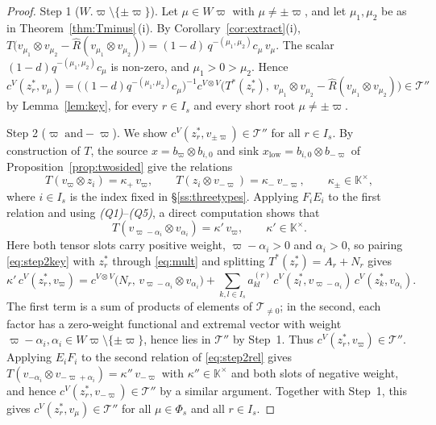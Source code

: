 \documentclass[12pt]{amsart}
\theoremstyle{plain}
\theoremstyle{remark}
\newcommand{\ot}{\otimes}
\newcommand{\vp}{\varpi}
\newcommand{\Rhat}{\widehat{R}}
\newcommand{\Phis}{\Phi_{s}}
\newcommand{\K}{\mathbb{K}}
\begin{document}
\begin{proof}
Step 1 ($W.\vp \setminus \{\pm \vp\}$). Let $\mu\in W\vp$ with $\mu\neq\pm\vp$, and let
$\mu_1,\mu_2$ be as in Theorem~\ref{thm:Tminus}\,(i). By
Corollary~\ref{cor:extract}(i),
$T\big(v_{\mu_1}\ot v_{\mu_2}-\Rhat(v_{\mu_1}\ot v_{\mu_2})\big)
=(1-d)\,q^{-(\mu_1,\mu_2)}c_\mu\,v_\mu$. The scalar $(1-d)q^{-(\mu_1,\mu_2)}c_\mu$ is non-zero, and $\mu_1>0>\mu_2$. Hence
\[
c^V(z_r^*,v_\mu)=\big((1-d)q^{-(\mu_1,\mu_2)}c_\mu\big)^{-1}
c^{V\ot V}\big(T^*(z_r^*),\ v_{\mu_1}\ot v_{\mu_2}-\Rhat(v_{\mu_1}\ot v_{\mu_2})\big)
\in\mathscr{T}''
\]
by Lemma~\ref{lem:key}, for every $r\in I_s$ and every short root $\mu\neq\pm\vp$.

Step 2 ($\vp\;\text{and} -\vp$). We show $c^V(z_r^*,v_{\pm\vp})\in\mathscr{T}''$ for
all $r\in I_s$. By construction of $T$, the source $x=b_\vp\ot b_{i,0}$ and sink
$x_{\mathrm{low}}=b_{i,0}\ot b_{-\vp}$ of Proposition~\ref{prop:twosided} give the relations
\begin{equation}\label{eq:step2rel}
T(v_\vp\ot z_i)=\kappa_+\,v_\vp,\qquad
T(z_i\ot v_{-\vp})=\kappa_-\,v_{-\vp},\qquad \kappa_\pm\in\K^\times,
\end{equation}
where $i\in I_s$ is the index fixed in \S\ref{ss:threetypes}. Applying $F_iE_i$ to the first relation and using \emph{(Q1)}--\emph{(Q5)}, a direct computation shows that
\begin{equation}\label{eq:step2key}
T(v_{\vp-\alpha_i}\ot v_{\alpha_i})=\kappa'\,v_\vp,\qquad \kappa'\in\K^\times.
\end{equation}
Here both tensor slots carry positive weight, $\vp-\alpha_i>0$ and $\alpha_i>0$, so
pairing \eqref{eq:step2key} with $z_r^*$ through \eqref{eq:mult} and splitting
$T^*(z_r^*)=A_r+N_r$ gives
\[
\kappa'\,c^V(z_r^*,v_\vp)=c^{V\ot V}\big(N_r,\,v_{\vp-\alpha_i}\ot v_{\alpha_i}\big)
+\sum_{k,l\in I_s}a^{(r)}_{kl}\,c^V(z_l^*,v_{\vp-\alpha_i})\,c^V(z_k^*,v_{\alpha_i}).
\]
The first term is a sum of products of elements of $\mathscr{T}_{\neq0}$; in the
second, each factor has a zero-weight functional and extremal vector with weight
$\vp-\alpha_i,\alpha_i\in W\vp\setminus\{\pm\vp\}$, hence lies in $\mathscr{T}''$ by
Step~1. Thus $c^V(z_r^*,v_\vp)\in\mathscr{T}''$. Applying $E_iF_i$ to the
second relation of \eqref{eq:step2rel} gives
$T(v_{-\alpha_i}\ot v_{-\vp+\alpha_i})=\kappa''\,v_{-\vp}$ with $\kappa''\in\K^\times$
and both slots of negative weight, and hence $c^V(z_r^*,v_{-\vp})\in\mathscr{T}''$ by a similar argument. Together with Step~1, this gives
$c^V(z_r^*,v_\mu)\in\mathscr{T}''$ for all $\mu\in\Phis$ and all $r\in I_s$.


\end{proof}
\end{document}
